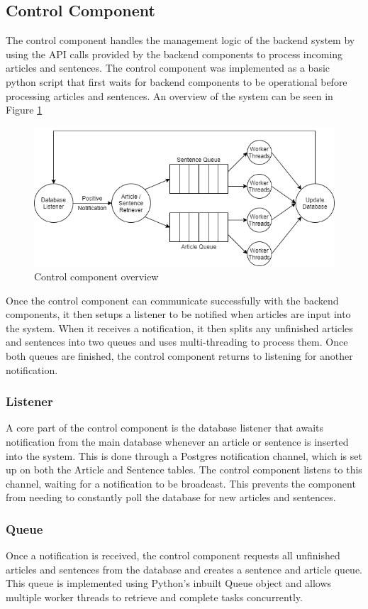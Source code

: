         \subsection{Control Component}
        The control component handles the management logic of the backend system by using the API calls provided by the backend components to process incoming articles and sentences. The control component was implemented as a basic python script that first waits for backend components to be operational before processing articles and sentences. An overview of the system can be seen in Figure \ref{fig:control}
        
        \begin{figure}[h]
                \centering
                \includegraphics[width=0.5\linewidth]{images/upload/control.png}    
                \caption{Control component overview}
                \label{fig:control}
        \end{figure}
            
        Once the control component can communicate successfully with the backend components, it then setups a listener to be notified when articles are input into the system. When it receives a notification, it then splits any unfinished articles and sentences into two queues and uses multi-threading to process them. Once both queues are finished, the control component returns to listening for another notification. 
            
            \subsubsection{Listener}
            A core part of the control component is the database listener that awaits notification from the main database whenever an article or sentence is inserted into the system. This is done through a Postgres notification channel, which is set up on both the Article and Sentence tables. The control component listens to this channel, waiting for a notification to be broadcast. This prevents the component from needing to constantly poll the database for new articles and sentences.
           
            \subsubsection{Queue}
            Once a notification is received, the control component requests all unfinished articles and sentences from the database and creates a sentence and article queue. This queue is implemented using Python’s inbuilt Queue object and allows multiple worker threads to retrieve and complete tasks concurrently. 
            
